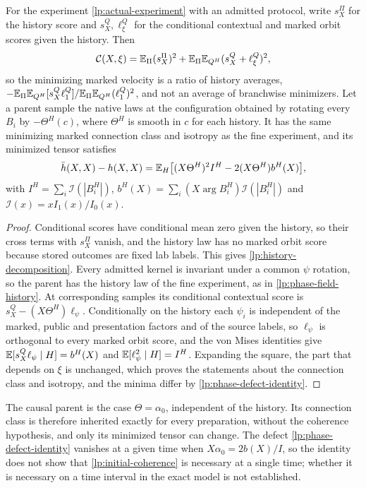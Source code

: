 For the experiment \cref{lp:actual-experiment} with an admitted protocol, write $s^\Pi_X$ for the history score and $s^Q_X,\ell^Q_\xi$ for the conditional contextual and marked orbit scores given the history. Then
\begin{equation}
 \mathcal C(X,\xi)=\mathbb E_\Pi(s^\Pi_X)^2+\mathbb E_\Pi\mathbb E_{Q^H}(s^Q_X+\ell^Q_\xi)^2,
 \label{lp:history-decomposition}
\end{equation}
so the minimizing marked velocity is a ratio of history averages, $-\mathbb E_\Pi\mathbb E_{Q^H}[s^Q_X\ell^Q_1]/\mathbb E_\Pi\mathbb E_{Q^H}(\ell^Q_1)^2$, and not an average of branchwise minimizers. Let a parent sample the native laws at the configuration obtained by rotating every $B_i$ by $-\Theta^H(c)$, where $\Theta^H$ is smooth in $c$ for each history. It has the same minimizing marked connection class and isotropy as the fine experiment, and its minimized tensor satisfies
\begin{equation}
 \bar h(X,X)-h(X,X)=\mathbb E_H\bigl[(X\Theta^H)^2I^H-2(X\Theta^H)b^H(X)\bigr],
 \label{lp:phase-defect-identity}
\end{equation}
with $I^H=\sum_i\mathcal I(|B_i^H|)$, $b^H(X)=\sum_i(X\arg B_i^H)\mathcal I(|B_i^H|)$ and $\mathcal I(x)=xI_1(x)/I_0(x)$.
\begin{proof}
Conditional scores have conditional mean zero given the history, so their cross terms with $s^\Pi_X$ vanish, and the history law has no marked orbit score because stored outcomes are fixed lab labels. This gives \cref{lp:history-decomposition}. Every admitted kernel is invariant under a common $\psi$ rotation, so the parent has the history law of the fine experiment, as in \cref{lp:phase-field-history}. At corresponding samples its conditional contextual score is $s^Q_X-(X\Theta^H)\ell_\psi$. Conditionally on the history each $\psi_i$ is independent of the marked, public and presentation factors and of the source labels, so $\ell_\psi$ is orthogonal to every marked orbit score, and the von Mises identities give $\mathbb E[s^Q_X\ell_\psi\mid H]=b^H(X)$ and $\mathbb E[\ell_\psi^2\mid H]=I^H$. Expanding the square, the part that depends on $\xi$ is unchanged, which proves the statements about the connection class and isotropy, and the minima differ by \cref{lp:phase-defect-identity}.
\end{proof}

The causal parent is the case $\Theta=\alpha_0$, independent of the history. Its connection class is therefore inherited exactly for every preparation, without the coherence hypothesis, and only its minimized tensor can change. The defect \cref{lp:phase-defect-identity} vanishes at a given time when $X\alpha_0=2b(X)/I$, so the identity does not show that \cref{lp:initial-coherence} is necessary at a single time; whether it is necessary on a time interval in the exact model is not established.

